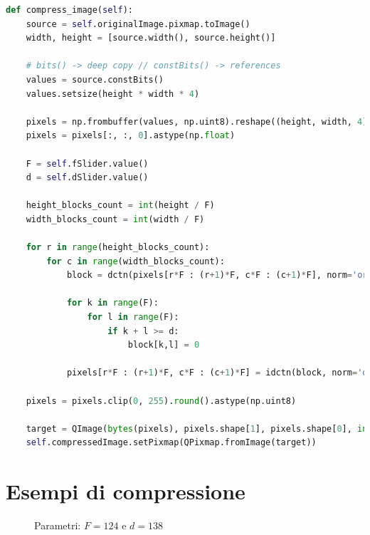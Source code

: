 \documentclass[11pt,italian]{article}
\begin{document}
\newpage
\begin{lstlisting}[language=Python,label=code:algo-compression,caption=Implementazione in Python dell'algoritmo di compressione]
def compress_image(self):
    source = self.originalImage.pixmap.toImage()
    width, height = [source.width(), source.height()]

    # bits() -> deep copy // constBits() -> references
    values = source.constBits()
    values.setsize(height * width * 4)

    pixels = np.frombuffer(values, np.uint8).reshape((height, width, 4)).copy()
    pixels = pixels[:, :, 0].astype(np.float)

    F = self.fSlider.value()
    d = self.dSlider.value()

    height_blocks_count = int(height / F)
    width_blocks_count = int(width / F)

    for r in range(height_blocks_count):
        for c in range(width_blocks_count):
            block = dctn(pixels[r*F : (r+1)*F, c*F : (c+1)*F], norm='ortho')

            for k in range(F):
                for l in range(F):
                    if k + l >= d:
                        block[k,l] = 0

            pixels[r*F : (r+1)*F, c*F : (c+1)*F] = idctn(block, norm='ortho')

    pixels = pixels.clip(0, 255).round().astype(np.uint8)

    target = QImage(bytes(pixels), pixels.shape[1], pixels.shape[0], int(pixels.nbytes/height), QImage.Format_Grayscale8)
    self.compressedImage.setPixmap(QPixmap.fromImage(target))
\end{lstlisting}

\newpage
\section{Esempi di compressione}
\label{section:examples}
\begin{figure}[H]
    \caption{Parametri: $F=124$ e $d=138$}
    \label{fig:deer-1}
\end{figure}
\end{document}
